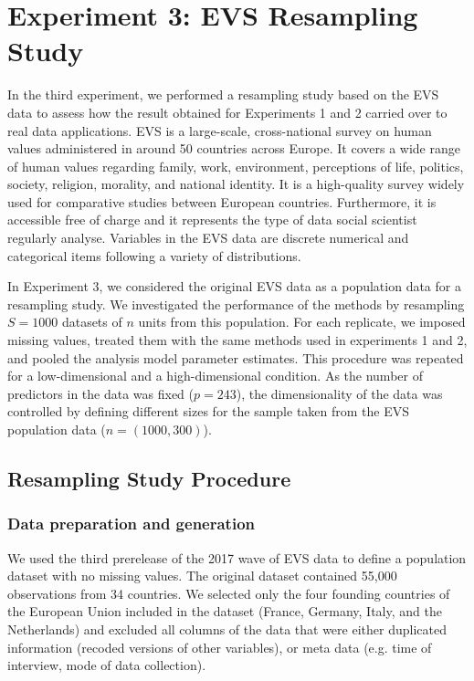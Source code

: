 \section{Experiment 3: EVS Resampling Study}

In the third experiment, we performed a resampling study based on the EVS data to assess
how the result obtained for Experiments 1 and 2 carried over to real data applications.
EVS is a large-scale, cross-national survey on human values administered in around 50 countries
across Europe.
It covers a wide range of human values regarding family, work, environment, perceptions of 
life, politics, society, religion, morality, and national identity.
It is a high-quality survey widely used for comparative studies between European countries.
Furthermore, it is accessible free of charge and it represents the type of data social scientist 
regularly analyse.
Variables in the EVS data are discrete numerical and categorical items following a 
variety of distributions.

In Experiment 3, we considered the original EVS data as a population data for a resampling study.
We investigated the performance of the methods by resampling $S=1000$ datasets of $n$ units from this 
population.
For each replicate, we imposed missing values, treated them with the same methods used in 
experiments 1 and 2, and pooled the analysis model parameter estimates.
This procedure was repeated for a low-dimensional and a high-dimensional condition. 
As the number of predictors in the data was fixed ($p = 243$), the dimensionality of the data was 
controlled by defining different sizes for the sample taken from the EVS population data 
($n = (1000, 300)$).

\subsection{Resampling Study Procedure} \label{resProc}

\subsubsection{Data preparation and generation}
	We used the third prerelease of the 2017 wave of EVS data \citep{EVS:2017} to define a population dataset 
	with no missing values.
	The original dataset contained 55,000 observations from 34 countries.
	We selected only the four founding countries of the European Union included in the dataset (France, Germany,
	Italy, and the Netherlands) and excluded all columns of the data that were either duplicated
	information (recoded versions of other variables), or meta data (e.g. time of interview,
	mode of data collection).

